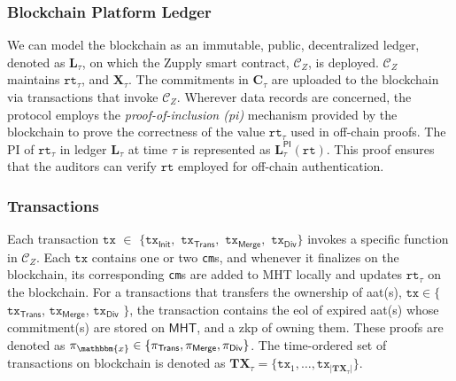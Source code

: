 \subsubsection{Blockchain Platform Ledger}
We can model the blockchain as an immutable, public, decentralized ledger, denoted as $\mathbf{L}_\tau$, on which the Zupply smart contract, $\mathcal{C}_Z$, is deployed.  $\mathcal{C}_Z$ maintains $\texttt{rt}_\tau$, and $\mathbf{X}_\tau$. The commitments in $\mathbf{C}_\tau$ are uploaded to the blockchain via transactions that invoke $\mathcal{C}_Z$. Wherever data records are concerned, the protocol employs the \textit{proof-of-inclusion (\gls{pi})} mechanism provided by the blockchain to prove the correctness of the value $\texttt{rt}_\tau$ used in off-chain proofs. The PI of $\texttt{rt}_\tau$ in ledger $\mathbf{L}_\tau$ at time $\tau$ is represented as $\mathbf{L}_\tau^\mathsf{PI}(\texttt{rt})$. This proof ensures that the auditors can  verify  $\texttt{rt}$ employed for off-chain authentication.  

\subsubsection{Transactions}
Each transaction  $\texttt{tx}$ $\in$ $\{ \texttt{tx}_\textsf{Init},$ $\texttt{tx}_\textsf{Trans},$ $\texttt{tx}_\textsf{Merge},$ $\texttt{tx}_\textsf{Div} \}$ invokes a specific function in $\mathcal{C}_Z$. Each $\texttt{tx}$ contains one or two \texttt{cm}s, and whenever it finalizes on the blockchain,  its corresponding \texttt{cm}s are added to \textsf{MHT} locally and updates $\texttt{rt}_\tau$  on the blockchain. For a transactions that transfers the ownership of \gls{aat}(s), $\texttt{tx} \in \{$$\texttt{tx}_\textsf{Trans}$, $\texttt{tx}_\textsf{Merge}$, $\texttt{tx}_\textsf{Div}$ $\}$, the transaction contains the \gls{eol} of expired \gls{aat}(s) whose commitment(s) are stored on $\mathsf{MHT}$, and a \gls{zkp} of owning them. These proofs are denoted as $\pi_\mathbbm{x} \in \{\pi_\textsf{Trans}, \pi_\textsf{Merge}, \pi_\textsf{Div} \}$. 
The time-ordered set of transactions on blockchain is denoted as $\mathbf{TX}_\tau = \{\texttt{tx}_1, \dots, \texttt{tx}_{|\mathbf{TX}_\tau|}\}$.


